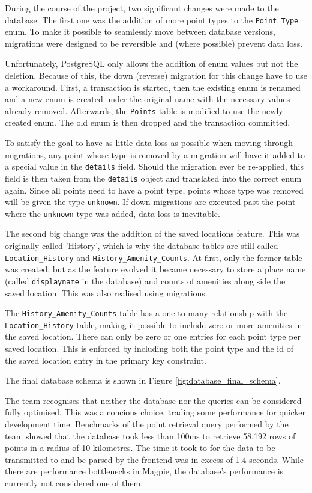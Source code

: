 During the course of the project, two significant changes were made to the
database. The first one was the addition of more point types to the
\texttt{Point\_Type} enum. To make it possible to seamlessly move between
database versions, migrations were designed to be reversible and (where
possible) prevent data loss.

Unfortunately, PostgreSQL only allows the addition of enum values but not the
deletion. Because of this, the down (reverse) migration for this change have to
use a workaround. First, a transaction is started, then the existing enum is
renamed and a new enum is created under the original name with the necessary
values already removed. Afterwards, the \texttt{Points} table is modified to use
the newly created enum. The old enum is then dropped and the transaction
committed.

To satisfy the goal to have as little data loss as possible when moving through
migrations, any point whose type is removed by a migration will have it added to
a special value in the \texttt{details} field. Should the migration ever be
re-applied, this field is then taken from the \texttt{details} object and
translated into the correct enum again. Since all points need to have a point
type, points whose type was removed will be given the type \texttt{unknown}. If
down migrations are executed past the point where the \texttt{unknown} type was
added, data loss is inevitable.

The second big change was the addition of the saved locations feature. This was
originally called 'History', which is why the database tables are still called
\texttt{Location\_History} and \texttt{History\_Amenity\_Counts}. At first, only
the former table was created, but as the feature evolved it became necessary to
store a place name (called \texttt{displayname} in the database) and counts of
amenities along side the saved location. This was also realised using migrations.

The \texttt{History\_Amenity\_Counts} table has a one-to-many relationship with
the \texttt{Location\_History} table, making it possible to include zero or more
amenities in the saved location. There can only be zero or one entries for each
point type per saved location. This is enforced by including both the point type
and the id of the saved location entry in the primary key constraint.

The final database schema is shown in Figure \ref{fig:database_final_schema}.

The team recognises that neither the database nor the queries can be considered
fully optimised. This was a concious choice, trading some performance for
quicker development time. Benchmarks of the point retrieval query performed by
the team showed that the database took less than 100ms to retrieve 58,192 rows
of points in a radius of 10 kilometres. The time it took to for the data to be
transmitted to and be parsed by the frontend was in excess of 1.4 seconds. While
there are performance bottlenecks in Magpie, the database's performance is
currently not considered one of them.

